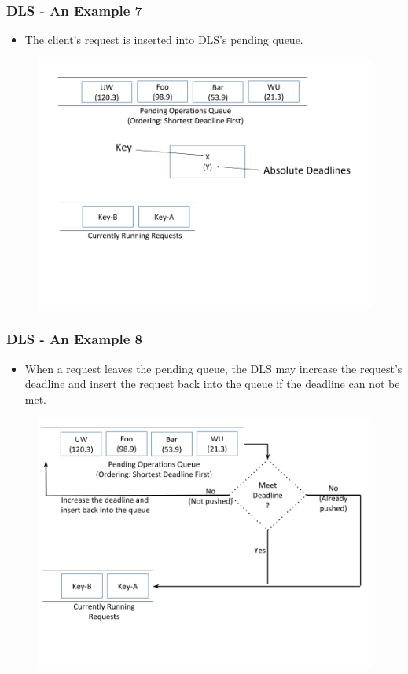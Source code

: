 \documentclass{beamer}
\begin{document}
\begin{frame}
  \frametitle{DLS - An Example 7}
  \begin{itemize}
    \item The client's request is inserted into DLS's pending queue.
  \end{itemize}
  \begin{figure}
    \begin{center}
      \centerline{\includegraphics[scale=0.38]{img/DLS_Example8.png}}
    \end{center}
  \end{figure}
\end{frame}

\begin{frame}
  \frametitle{DLS - An Example 8}
  \begin{itemize}
    \item When a request leaves the pending queue, the DLS may increase the
      request's deadline and insert the request back into the queue if the
      deadline can not be met.
  \end{itemize}
  \begin{figure}
    \begin{center}
      \centerline{\includegraphics[scale=0.35]{img/DLS_Example9.png}}
    \end{center}
  \end{figure}
\end{frame}
\end{document}
